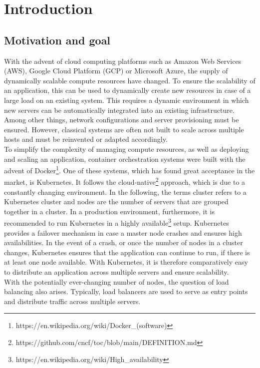 \chapter{Introduction}


\section{Motivation and goal}
With the advent of cloud computing platforms such as Amazon Web Services (AWS), Google Cloud Platform (GCP) or Microsoft Azure, the supply of dynamically scalable compute resources have changed.
To ensure the scalability of an application, this can be used to dynamically create new resources in case of a large load on an existing system.
This requires a dynamic environment in which new servers can be automatically integrated into an existing infrastructure.
Among other things, network configurations and server provisioning must be ensured.
However, classical systems are often not built to scale across multiple hosts and must be reinvented or adapted accordingly.
\\
To simplify the complexity of managing compute resources, as well as deploying and scaling an application, container orchestration systems were built with the advent of Docker\footnote{https://en.wikipedia.org/wiki/Docker\_(software)}.
One of these systems, which has found great acceptance in the market, is Kubernetes.
It follows the cloud-native\footnote{https://github.com/cncf/toc/blob/main/DEFINITION.md} approach, which is due to a constantly changing environment.
In the following, the terms cluster refers to a Kubernetes cluster and nodes are the number of servers that are grouped together in a cluster.
In a production environment, furthermore, it is recommended to run Kubernetes in a highly available\footnote{https://en.wikipedia.org/wiki/High\_availability} setup.
Kubernetes provides a failover mechanism in case a master node crashes and ensures high availabilities.
In the event of a crash, or once the number of nodes in a cluster changes, Kubernetes ensures that the application can continue to run, if there is at least one node available.
With Kubernetes, it is therefore comparatively easy to distribute an application across multiple servers and ensure scalability.
\\
With the potentially ever-changing number of nodes, the question of load balancing also arises.
Typically, load balancers are used to serve as entry points and distribute traffic across multiple servers.
